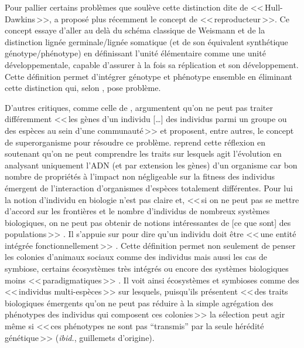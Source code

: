 Pour pallier certains problèmes que soulève cette distinction dite de <<\,Hull-Dawkins\,>>, \cite{griesemer2000reproductionandthereductionofgenetics} a proposé plus récemment le concept de <<\,reproducteur\,>>. Ce concept essaye d'aller au delà du schéma classique de Weismann et de la distinction lignée germinale/lignée somatique (et de son équivalent synthétique génotype/phénotype) en définissant l'unité élémentaire comme une unité développementale, capable d'assurer à la fois sa réplication et son développement. Cette définition permet d'intégrer génotype et phénotype ensemble en éliminant cette distinction qui, selon \cite{griesemer2000reproductionandthereductionofgenetics,griesemer2002whatisepiaboutepigenetics}, pose problème. 

D'autres critiques, comme celle de \cite{wilson1989revivingsuperorganism}, argumentent qu'on ne peut pas traiter différemment <<\,les gènes d'un individu [\ldots] des individus parmi un groupe ou des espèces au sein d'une communauté\,>> et proposent, entre autres, le concept de superorganisme pour résoudre ce problème. \cite{bouchard2009understandingcolonialtraitsusingsymbiosisresearchandecosystemecology,bouchard2011darwinismwithoutpopulationsamoreinclusiveunderstandingofsotf} reprend cette réflexion en soutenant qu'on ne peut comprendre les traits sur lesquels agit l'évolution en analysant uniquement l'ADN (et par extension les gènes) d'un organisme car bon nombre de propriétés à l'impact non négligeable sur la fitness des individus émergent de l'interaction d'organismes d'espèces totalement différentes. Pour lui la notion d'individu en biologie n'est pas claire et, <<\,si on ne peut pas se mettre d'accord sur les frontières et le nombre d'individus de nombreux systèmes biologiques, on ne peut pas obtenir de notions intéressantes de [ce que sont] des populations\,>> \citep[p.~17]{bouchard2011darwinismwithoutpopulationsamoreinclusiveunderstandingofsotf}. Il s'appuie sur \cite{wilson1989revivingsuperorganism} pour dire qu'un individu doit être <<\,une entité intégrée fonctionnellement\,>> \citep[p.~3]{bouchard2009understandingcolonialtraitsusingsymbiosisresearchandecosystemecology}. Cette définition permet non seulement de penser les colonies d'animaux sociaux comme des individus mais aussi les cas de symbiose, certains écosystèmes très intégrés ou encore des systèmes biologiques moins <<\,paradigmatiques\,>> \citep{bouchard2009understandingcolonialtraitsusingsymbiosisresearchandecosystemecology,bouchard2011darwinismwithoutpopulationsamoreinclusiveunderstandingofsotf}. Il voit ainsi écosystèmes et symbioses comme des <<\,individus multi-espèces\,>> \citep[p.~10]{bouchard2009understandingcolonialtraitsusingsymbiosisresearchandecosystemecology} sur lesquels, puisqu'ils présentent <<\,des traits biologiques émergents qu'on ne peut pas réduire à la simple agrégation des phénotypes des individus qui composent ces colonies\,>> la sélection peut agir même si <<\,ces phénotypes ne sont pas ``transmis'' par la seule hérédité génétique\,>> (\emph{ibid.}, guillemets d'origine).

